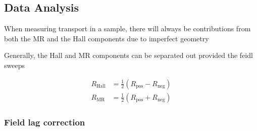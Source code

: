 \subsection{Data Analysis}

When measuring transport in a sample, there will always be contributions from both the \ac{MR} and the Hall components due to imperfect geometry


Generally, the Hall and \ac{MR} components can be separated out provided the feidl sweeps

\begin{align}
R_{\textrm{Hall}} &= \frac{1}{2}( R_{\textrm{pos}} - R_{\textrm{neg}} ) \\
R_{\textrm{MR}} &= \frac{1}{2}( R_{\textrm{pos}} + R_{\textrm{neg}} )
\end{align}

\subsubsection{Field lag correction}




